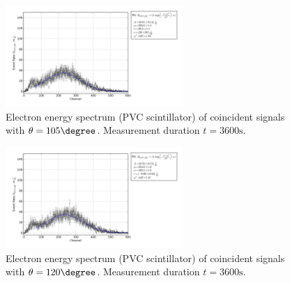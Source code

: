 \begin{figure}[h!]
  \centering
  \includegraphics[width=0.6\textwidth]{plots/pvc_105.png}
  \caption{Electron energy spectrum (PVC scintillator) of coincident signals
  with $\theta=105\degree$. Measurement duration $t=3600\mathrm{s}$.}
  \label{fig:pvc105}
\end{figure}
\begin{figure}[h!]
  \centering
  \includegraphics[width=0.6\textwidth]{plots/pvc_120.png}
  \caption{Electron energy spectrum (PVC scintillator) of coincident signals
  with $\theta=120\degree$. Measurement duration $t=3600\mathrm{s}$.}
  \label{fig:pvc120}
\end{figure}

\FloatBarrier
